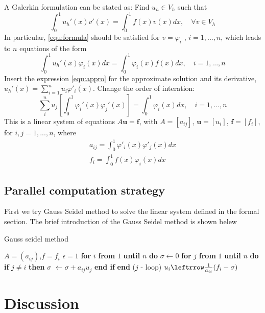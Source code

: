 \documentclass[11pt]{article}
\begin{document}
A Galerkin formulation can be stated as: Find $u_h \in V_h$ such that
\begin{equation}\label{equ:formula}
	\int_0^1u_h'(x)v'(x) = \int_0^1f(x)v(x) dx, \quad \forall v \in V_h 
\end{equation}
In particular, \eqref{equ:formula} should be satisfied for $v = \varphi_i$ , $i = 1,...,n$, which leads to $n$ equations of the form
\begin{equation}
	\int_0^1 u_h'(x)\varphi_i(x)dx = \int_0^1\varphi_i(x)f(x)dx, \quad i = 1,...,n
\end{equation}
Insert the expression \eqref{equ:appro} for the approximate solution and its derivative, $u_h'(x) = \sum_{i=1}^n u_i\varphi'_i(x)$.
Change the order of interation:
\begin{equation}
	\sum_i^n u_j\left[\int_0^1\varphi_i'(x) \varphi_j'(x)\right]= \int_0^1\varphi_i(x) dx, \quad i = 1,...,n
\end{equation}
This is a linear system of equations $A\mathbf{u} = \mathbf{f}$, with $A = [a_{ij}]$, $\mathbf{u} = [u_i]$, $\mathbf{f} = [f_i]$, for $i,j = 1,...,n$, where
\begin{align}
	a_{ij} = \int_0^1\varphi'_i(x)\varphi'_j(x)dx \\
	f_i  = \int_0^1f(x)\varphi_i(x) dx
\end{align}

\subsection{Parallel computation strategy}
First we try Gauss Seidel method to solve the linear system defined in the formal section. The brief introduction of the Gauss Seidel method is shown belew
\begin{algorithm}
\caption{Gauss seidel method}\label{alg:gauss_seidel}
\begin{algorithmic}
\Require $A = (a_{ij})$,$f = f_i$
\State $\epsilon=1$
\State \textbf{for} $i$ \textbf{from} $1$ \textbf{until} $n$ \textbf{do}
\State \quad $\sigma \leftarrow 0$
\State \quad \textbf{for} $j$ \textbf{from} $1$ \textbf{until} $n$ \textbf{do}
\State \quad \quad \textbf{if} $j \neq i$
\textbf{then}
\State \quad  \quad  $\sigma$ $\leftarrow \sigma + a_{ij}u_j$
\State \quad  \quad \textbf{end if}
\State \quad \textbf{end} ($j$ - loop)
\State $u_i \leftrrow \frac{1}{a_{ii}} (f_i - \sigma)$
\EndWhile
\end{algorithmic}
\end{algorithm}


\section{Discussion}
\end{document}
